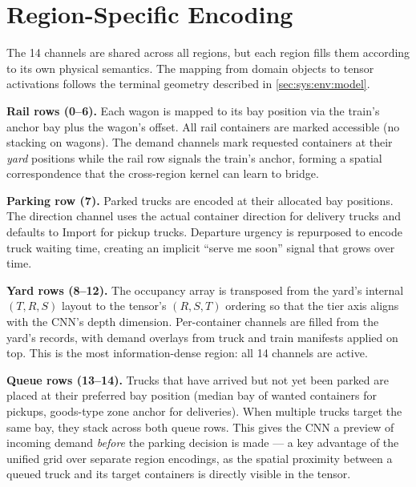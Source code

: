 \section{Region-Specific Encoding}
\label{sec:state:regions}

The 14 channels are shared across all regions, but each region fills them according to its own physical semantics. The mapping from domain objects to tensor activations follows the terminal geometry described in \cref{sec:sys:env:model}.

\textbf{Rail rows (0--6).} Each wagon is mapped to its bay position via the train's anchor bay plus the wagon's offset. All rail containers are marked accessible (no stacking on wagons). The demand channels mark requested containers at their \emph{yard} positions while the rail row signals the train's anchor, forming a spatial correspondence that the cross-region kernel can learn to bridge.

\textbf{Parking row (7).} Parked trucks are encoded at their allocated bay positions. The direction channel uses the actual container direction for delivery trucks and defaults to Import for pickup trucks. Departure urgency is repurposed to encode truck waiting time, creating an implicit ``serve me soon'' signal that grows over time.

\textbf{Yard rows (8--12).} The occupancy array is transposed from the yard's internal $(T, R, S)$ layout to the tensor's $(R, S, T)$ ordering so that the tier axis aligns with the CNN's depth dimension. Per-container channels are filled from the yard's records, with demand overlays from truck and train manifests applied on top. This is the most information-dense region: all 14 channels are active.

\textbf{Queue rows (13--14).} Trucks that have arrived but not yet been parked are placed at their preferred bay position (median bay of wanted containers for pickups, goods-type zone anchor for deliveries). When multiple trucks target the same bay, they stack across both queue rows. This gives the CNN a preview of incoming demand \emph{before} the parking decision is made --- a key advantage of the unified grid over separate region encodings, as the spatial proximity between a queued truck and its target containers is directly visible in the tensor.
